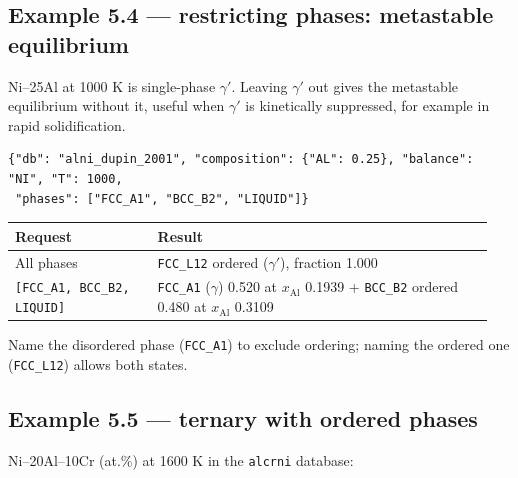 \documentclass[12pt,a4paper]{article}
\begin{document}
\subsection*{Example 5.4 --- restricting phases: metastable equilibrium}
Ni--25Al at 1000 K is single-phase \(\gamma '\). Leaving \(\gamma '\) out gives the metastable equilibrium without it, useful when \(\gamma '\) is kinetically suppressed, for example in rapid solidification.

\begin{lstlisting}[basicstyle={\footnotesize\ttfamily}]
{"db": "alni_dupin_2001", "composition": {"AL": 0.25}, "balance": "NI", "T": 1000,
 "phases": ["FCC_A1", "BCC_B2", "LIQUID"]}
\end{lstlisting}
\begingroup\small
\begin{longtable}{>{\raggedright\arraybackslash}p{0.285\linewidth}>{\raggedright\arraybackslash}p{0.662\linewidth}}
\toprule
\textbf{Request} & \textbf{Result} \\
\midrule
\endhead
All phases & \texttt{FCC\_\allowbreak{}L12} ordered (\(\gamma '\)), fraction 1.000 \\
\texttt{[\textquotedbl{}FCC\_\allowbreak{}A1\textquotedbl{},\allowbreak{} \textquotedbl{}BCC\_\allowbreak{}B2\textquotedbl{},\allowbreak{} \textquotedbl{}LIQUID\textquotedbl{}]} & \texttt{FCC\_\allowbreak{}A1} (\(\gamma\)) 0.520 at \(x_{\mathrm{Al}}\) 0.1939 + \texttt{BCC\_\allowbreak{}B2} ordered 0.480 at \(x_{\mathrm{Al}}\) 0.3109 \\
\bottomrule
\end{longtable}
\endgroup
Name the disordered phase (\texttt{FCC\_\allowbreak{}A1}) to exclude ordering; naming the ordered one (\texttt{FCC\_\allowbreak{}L12}) allows both states.


\subsection*{Example 5.5 --- ternary with ordered phases}
Ni--20Al--10Cr (at.\%) at 1600 K in the \texttt{alcrni} database:
\end{document}
